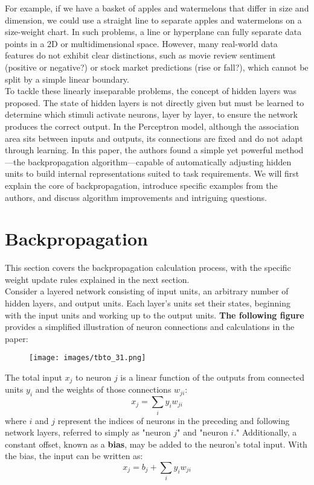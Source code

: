 \documentclass[11p,oneside]{book}
\begin{document}
For example, if we have a basket of apples and watermelons that differ in size and dimension, we could use a straight line to separate apples and watermelons on a size-weight chart. In such problems, a line or hyperplane can fully separate data points in a 2D or multidimensional space. However, many real-world data features do not exhibit clear distinctions, such as movie review sentiment (positive or negative?) or stock market predictions (rise or fall?), which cannot be split by a simple linear boundary. \\

To tackle these linearly inseparable problems, the concept of hidden layers was proposed. The state of hidden layers is not directly given but must be learned to determine which stimuli activate neurons, layer by layer, to ensure the network produces the correct output. In the Perceptron model, although the association area sits between inputs and outputs, its connections are fixed and do not adapt through learning. In this paper, the authors found a simple yet powerful method—the backpropagation algorithm—capable of automatically adjusting hidden units to build internal representations suited to task requirements. We will first explain the core of backpropagation, introduce specific examples from the authors, and discuss algorithm improvements and intriguing questions.

\section*{Backpropagation}

This section covers the backpropagation calculation process, with the specific weight update rules explained in the next section. \\

Consider a layered network consisting of input units, an arbitrary number of hidden layers, and output units. Each layer's units set their states, beginning with the input units and working up to the output units. \textbf{The following figure} provides a simplified illustration of neuron connections and calculations in the paper:

\begin{figure}[H]
    \centering
    \texttt{[image: images/tbto\_31.png]}
\end{figure}

The total input $x_j$ to neuron $j$ is a linear function of the outputs from connected units $y_i$ and the weights of those connections $w_{ji}$:
$$
x_j = \sum_i y_i w_{ji}
$$
where $i$ and $j$ represent the indices of neurons in the preceding and following network layers, referred to simply as "neuron $j$" and "neuron $i$." Additionally, a constant offset, known as a \textbf{bias}, may be added to the neuron’s total input. With the bias, the input can be written as:
$$
x_j = b_j + \sum_i y_i w_{ji}
$$
\end{document}
